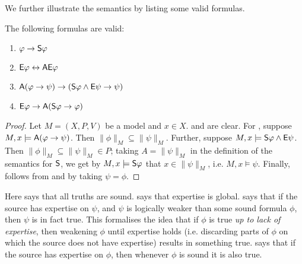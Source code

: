 We further illustrate the semantics by listing some valid formulas.

\begin{proposition}
\label{exp_prop_validities}

    The following formulas are valid:

    \begin{enumerate}
        \item\label{exp_item_truths_sound} $\phi \limplies \S\phi$

        \item\label{exp_item_e_global} $\E\phi \liff \A\E\phi$

        \item\label{exp_item_weakening} $\A(\phi \limplies \psi) \limplies (\S\phi
        \land \E\psi \limplies \psi)$

        \item\label{exp_item_e_and_s} $\E\phi \limplies \A(\S\phi \limplies \phi)$

    \end{enumerate}
\end{proposition}

\begin{proof}

    Let $M = (X, P, V)$ be a model and $x \in X$.  and
     are clear. For , suppose $M, x
    \models \A(\phi \limplies \psi)$. Then $\|\phi\|_M \subseteq \|\psi\|_M$.
    Further, suppose $M, x \models \S\phi \land \E\psi$. Then $\|\phi\|_M
    \subseteq \|\psi\|_M \in P$; taking $A = \|\psi\|_M$ in the definition of
    the semantics for $\S$, we get by $M, x \models \S\phi$ that $x \in
    \|\psi\|_M$, i.e. $M, x \models \psi$. Finally, 
    follows from  and  by taking
    $\psi = \phi$.
\end{proof}

Here  says that all truths are sound.
 says that expertise is global.  says
that if the source has expertise on $\psi$, and $\psi$ is logically weaker than
some sound formula $\phi$, then $\psi$ is in fact true. This formalises the
idea that if $\phi$ is true \emph{up to lack of expertise}, then weakening
$\phi$ until expertise holds (i.e. discarding parts of $\phi$ on which the
source does not have expertise) results in something true. 
says that if the source has expertise on $\phi$, then whenever $\phi$ is sound
it is also true.

